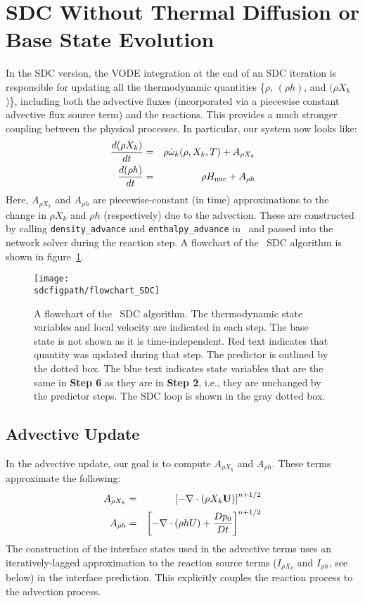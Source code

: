 \section{SDC Without Thermal Diffusion or Base State Evolution}
In the SDC version, the VODE integration at the end of an SDC
iteration is responsible for updating all the thermodynamic quantities
\{$\rho$, $(\rho h)$, and $(\rho X_k$)\}, including both the advective
fluxes (incorporated via a piecewise constant advective flux source
term) and the reactions.  This provides a much stronger coupling between
the physical processes.  In particular, our system now looks like:
\begin{eqnarray}
\frac{d(\rho X_k)}{dt} &=& \rho \dot{\omega}_k(\rho,X_k,T) + A_{\rho X_k} \label{eq:sdc:rhoX} \\
\frac{d(\rho h)}{dt}   &=& \rho {H_{\rm nuc}} + A_{\rho h} \label{eq:sdc:rhoh}
\end{eqnarray}
Here, $A_{\rho X_k}$ and $A_{\rho h}$ are piecewise-constant (in time)
approximations to the change in ${\rho X_k}$ and ${\rho h}$ (respectively)
due to the advection.  These are constructed by calling {\tt density\_advance}
and {\tt enthalpy\_advance} in \maestro\ and passed into the network solver
during the reaction step.  A flowchart of the \maestro\ SDC algorithm is 
shown in figure~\ref{fig:sdc:flowchart}.

\begin{figure}[tb]
\centering
\texttt{[image: \\sdcfigpath/flowchart\_SDC]}
\caption[Graphical flowchart of \maestro\ SDC]
  {\label{fig:sdc:flowchart} A flowchart of the \maestro\ SDC algorithm.  The
  thermodynamic state variables and local velocity are
  indicated in each step.  The base state is not shown as it is time-independent.
  Red text indicates that quantity was
  updated during that step.  The predictor is 
  outlined by the dotted box.  The blue text indicates state
  variables that are the same in {\bf Step 6} as they are in
  {\bf Step 2}, i.e., they are unchanged by the predictor steps.
  The SDC loop is shown in the gray dotted box.}
\end{figure}


\subsection{Advective Update}

In the advective update, our goal is to compute $A_{\rho X_k}$ and
$A_{\rho h}$.  These terms approximate the following:
\begin{eqnarray}
A_{\rho X_k} &=&  \left [- \nabla \cdot (\rho X_k {\bf U}) \right ]^{n+1/2} \\
A_{\rho h}   &=&  \left [- \nabla \cdot (\rho h U) + \frac{Dp_0}{Dt} \right ]^{n+1/2}
\end{eqnarray}
The construction of the interface states used in the advective terms
uses an iteratively-lagged approximation to the reaction source terms
($I_{\rho X_k}$ and $I_{\rho h}$, see below) in the interface
prediction.  This explicitly couples the reaction process to the
advection process.


